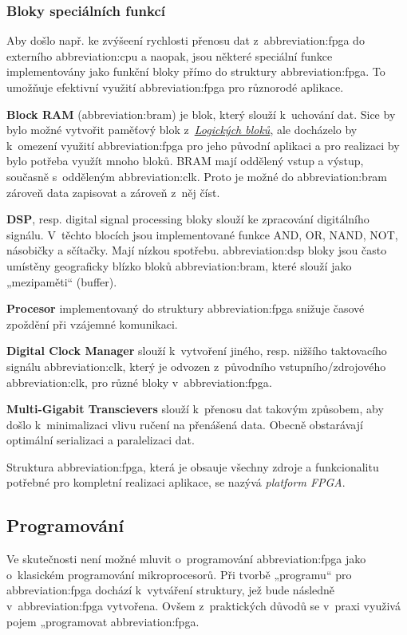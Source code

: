 \documentclass[a4paper, twoside, 11pt]{article}
\begin{document}
		\subsubsection{Bloky speciálních funkcí}
			Aby došlo např. ke zvýšeení rychlosti přenosu dat z~\gls{abbreviation:fpga} do externího \gls{abbreviation:cpu} a naopak, jsou některé speciální funkce implementovány jako funkční bloky přímo do struktury \gls{abbreviation:fpga}. To umožňuje efektivní využití \gls{abbreviation:fpga} pro různorodé aplikace. \cite{Sass2010}\par
			\textbf{Block RAM} (\gls{abbreviation:bram}) je blok, který slouží k~uchování dat. Sice by bylo možné vytvořit paměťový blok z~\hyperref[subsubsec:logicke-bloky]{\textit{Logických bloků}}, ale docházelo by k~omezení využití \gls{abbreviation:fpga} pro jeho původní aplikaci a pro realizaci by bylo potřeba využít mnoho bloků. BRAM mají oddělený vstup a výstup, současně s~odděleným \gls{abbreviation:clk}. Proto je možné do \gls{abbreviation:bram} zároveň data zapisovat a zároveň z~něj číst. \cite{Sass2010}\par
			\textbf{DSP}, resp. digital signal processing bloky slouží ke zpracování digitálního signálu. V~těchto blocích jsou implementované funkce AND, OR, NAND, NOT, násobičky a sčítačky. Mají nízkou spotřebu. \gls{abbreviation:dsp} bloky jsou často umístěny geograficky blízko bloků \gls{abbreviation:bram}, které slouží jako „mezipaměti“ (buffer). \cite{Sass2010}\par
			\textbf{Procesor} implementovaný do struktury \gls{abbreviation:fpga} snižuje časové zpoždění při vzájemné komunikaci. \cite{Sass2010}\par
			\textbf{Digital Clock Manager} slouží k~vytvoření jiného, resp. nižšího taktovacího signálu \gls{abbreviation:clk}, který je odvozen z~původního vstupního/zdrojového \gls{abbreviation:clk}, pro různé bloky v~\gls{abbreviation:fpga}. \cite{Sass2010}\par
			\textbf{Multi-Gigabit Transcievers} slouží k~přenosu dat takovým způsobem, aby došlo k~minimalizaci vlivu ručení na přenášená data. Obecně obstarávají optimální serializaci a paralelizaci dat. \cite{Sass2010}\par
			Struktura \gls{abbreviation:fpga}, která je obsauje všechny zdroje a funkcionalitu potřebné pro kompletní realizaci aplikace, se nazývá \textit{platform FPGA}.
		\subsection{Programování}
			Ve skutečnosti není možné mluvit o~programování \gls{abbreviation:fpga} jako o~klasickém programování mikroprocesorů. Při tvorbě „programu“ pro \gls{abbreviation:fpga} dochází k~vytváření struktury, jež bude následně v~\gls{abbreviation:fpga} vytvořena. Ovšem z~praktických důvodů se v~praxi využivá pojem „programovat \gls{abbreviation:fpga}.
\end{document}
